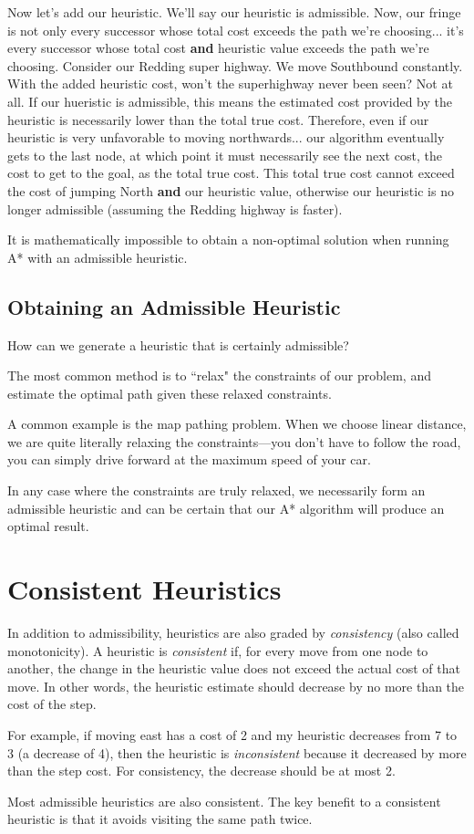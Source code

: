 \documentclass[12pt]{article}
\begin{document}
Now let's add our heuristic. We'll say our heuristic is admissible. Now, our fringe is not only every successor whose total cost exceeds the path we're choosing... it's every successor whose total cost \textbf{and} heuristic value exceeds the path we're choosing. Consider our Redding super highway. We move Southbound constantly. With the added heuristic cost, won't the superhighway never been seen? Not at all. If our hueristic is admissible, this means the estimated cost provided by the heuristic is necessarily lower than the total true cost. Therefore, even if our heuristic is very unfavorable to moving northwards... our algorithm eventually gets to the last node, at which point it must necessarily see the next cost, the cost to get to the goal, as the total true cost. This total true cost cannot exceed the cost of jumping North \textbf{and} our heuristic value, otherwise our heuristic is no longer admissible (assuming the Redding highway is faster).

It is mathematically impossible to obtain a non-optimal solution when running A* with an admissible heuristic.

\subsection*{Obtaining an Admissible Heuristic}

How can we generate a heuristic that is certainly admissible?

The most common method is to ``relax" the constraints of our problem, and estimate the optimal path given these relaxed constraints.

A common example is the map pathing problem. When we choose linear distance, we are quite literally relaxing the constraints—you don't have to follow the road, you can simply drive forward at the maximum speed of your car.

In any case where the constraints are truly relaxed, we necessarily form an admissible heuristic and can be certain that our A* algorithm will produce an optimal result.

\section*{Consistent Heuristics}

In addition to admissibility, heuristics are also graded by \emph{consistency} (also called monotonicity). A heuristic is \emph{consistent} if, for every move from one node to another, the change in the heuristic value does not exceed the actual cost of that move. In other words, the heuristic estimate should decrease by no more than the cost of the step.

For example, if moving east has a cost of 2 and my heuristic decreases from 7 to 3 (a decrease of 4), then the heuristic is \emph{inconsistent} because it decreased by more than the step cost. For consistency, the decrease should be at most 2.

Most admissible heuristics are also consistent. The key benefit to a consistent heuristic is that it avoids visiting the same path twice.
\end{document}
